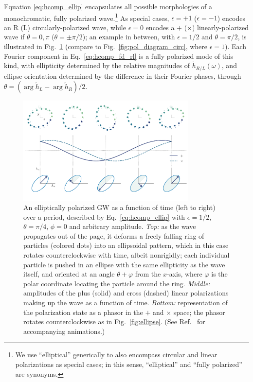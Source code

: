\documentclass[aps,prd,twocolumn,superscriptaddress,preprintnumbers,floatfix,nofootinbib]{revtex4-2}
\begin{document}
Equation \eqref{eq:hcomp_ellip} encapsulates all possible morphologies of a monochromatic, fully polarized wave.\footnote{We use ``elliptical'' generically to also encompass circular and linear polarizations as special cases; in this sense, ``elliptical'' and ``fully polarized'' are synonyms.}
As special cases, $\epsilon = +1$ ($\epsilon = -1$) encodes an R (L) circularly-polarized wave, while $\epsilon =0$ encodes a $+$ ($\times$) linearly-polarized wave if $\theta = 0,\pi$ ($\theta = \pm \pi/2$);
an example in between, with $\epsilon=1/2$ and $\theta = \pi/2$, is illustrated in Fig.~\ref{fig:pol_diagram_ellip} (compare to Fig.~\ref{fig:pol_diagram_circ}, where $\epsilon=1$).
Each Fourier component in Eq.~\eqref{eq:hcomp_fd_rl} is a fully polarized mode of this kind, with ellipticity determined by the relative magnitudes of $\tilde{h}_{R/L}(\omega)$, and ellipse orientation determined by the difference in their Fourier phases, through $\theta = (\arg \tilde{h}_L - \arg \tilde{h}_R)/2$.

\begin{figure}
\includegraphics[width=0.8\textwidth]{pol_diagram_ellip}
\caption{An elliptically polarized GW as a function of time (left to right) over a period, described by Eq.~\eqref{eq:hcomp_ellip} with $\epsilon=1/2$, $\theta=\pi/4$, $\phi=0$ and arbitrary amplitude. \emph{Top:} as the wave propagates out of the page, it deforms a freely falling ring of particles (colored dots) into an ellipsoidal pattern, which in this case rotates counterclockwise with time, albeit nonrigidly; each individual particle is pushed in an ellipse with the same ellipticity as the wave itself, and oriented at an angle $\theta + \varphi$ from the $x$-axis, where $\varphi$ is the polar coordinate locating the particle around the ring.
\emph{Middle:} amplitudes of the plus (solid) and cross (dashed) linear polarizations making up the wave as a function of time.
\emph{Bottom:} representation of the polarization state as a phasor in the $+$ and $\times$ space; the phasor rotates counterclockwise as in Fig.~\ref{fig:ellipse}.
(See Ref.~\cite{release} for accompanying animations.)
}
\label{fig:pol_diagram_ellip}
\end{figure}
\end{document}
